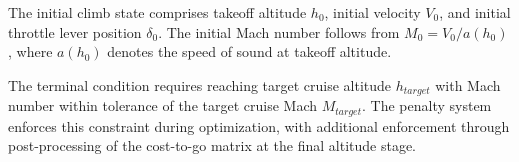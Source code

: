The initial climb state comprises takeoff altitude $h_0$, initial velocity $V_0$, and initial throttle lever position $\delta_0$. The initial Mach number follows from $M_0 = V_0/a(h_0)$, where $a(h_0)$ denotes the speed of sound at takeoff altitude.

The terminal condition requires reaching target cruise altitude $h_{target}$ with Mach number within tolerance of the target cruise Mach $M_{target}$. The penalty system enforces this constraint during optimization, with additional enforcement through post-processing of the cost-to-go matrix at the final altitude stage.
